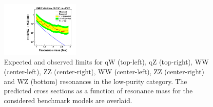\begin{figure}[h!tpb]
\begin{center}
\includegraphics[width=0.35\textwidth]{EXO-12-024/figs/limits/brazilianFlag_WZ_low_purity.pdf}
\end{center}
\caption{Expected and observed limits for qW (top-left), qZ (top-right), \GRS WW (center-left), \GRS ZZ (center-right), \GBulk WW (center-left), \GBulk ZZ (center-right) and WZ (bottom) resonances
 in the low-purity category.
  The predicted cross sections as a function of resonance mass for the considered benchmark models are overlaid.}
\label{fig:Vtagresults2}
\end{figure}

